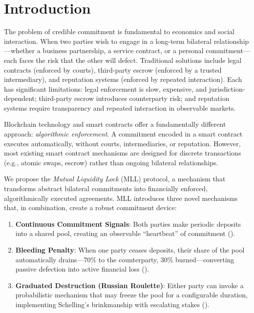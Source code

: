 \documentclass[12pt,a4paper]{article}
\begin{document}
\section{Introduction}
\label{sec:intro}

The problem of credible commitment is fundamental to economics and social interaction. When two parties wish to engage in a long-term bilateral relationship---whether a business partnership, a service contract, or a personal commitment---each faces the risk that the other will defect. Traditional solutions include legal contracts (enforced by courts), third-party escrow (enforced by a trusted intermediary), and reputation systems (enforced by repeated interaction). Each has significant limitations: legal enforcement is slow, expensive, and jurisdiction-dependent; third-party escrow introduces counterparty risk; and reputation systems require transparency and repeated interaction in observable markets.

Blockchain technology and smart contracts offer a fundamentally different approach: \textit{algorithmic enforcement}. A commitment encoded in a smart contract executes automatically, without courts, intermediaries, or reputation. However, most existing smart contract mechanisms are designed for discrete transactions (e.g., atomic swaps, escrow) rather than ongoing bilateral relationships.

We propose the \textit{Mutual Liquidity Lock} (MLL) protocol, a mechanism that transforms abstract bilateral commitments into financially enforced, algorithmically executed agreements. MLL introduces three novel mechanisms that, in combination, create a robust commitment device:

\begin{enumerate}
  \item \textbf{Continuous Commitment Signals}: Both parties make periodic deposits into a shared pool, creating an observable ``heartbeat'' of commitment ().
  \item \textbf{Bleeding Penalty}: When one party ceases deposits, their share of the pool automatically drains---70\% to the counterparty, 30\% burned---converting passive defection into active financial loss ().
  \item \textbf{Graduated Destruction (Russian Roulette)}: Either party can invoke a probabilistic mechanism that may freeze the pool for a configurable duration, implementing Schelling's brinkmanship \citep{schelling1960} with escalating stakes ().
\end{enumerate}
\end{document}
